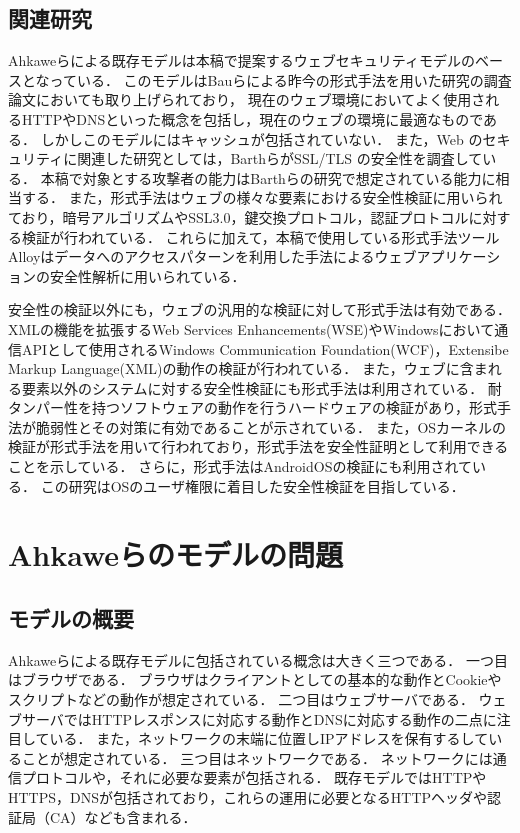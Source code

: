 \documentclass{css}
\begin{document}
\subsection{関連研究}
Ahkaweらによる既存モデル\cite{webmodel}は本稿で提案するウェブセキュリティモデルのベースとなっている．
このモデルはBauらによる昨今の形式手法を用いた研究の調査論文\cite{security_modeling_and_analysis}においても取り上げられており，
現在のウェブ環境においてよく使用されるHTTPやDNSといった概念を包括し，現在のウェブの環境に最適なものである．
しかしこのモデルにはキャッシュが包括されていない．
また，Web のセキュリティに関連した研究としては，Barthら\cite{securing_frame_communication_in_browsers}がSSL/TLS の安全性を調査している．
本稿で対象とする攻撃者の能力はBarthらの研究で想定されている能力に相当する．
また，形式手法はウェブの様々な要素における安全性検証に用いられており，暗号アルゴリズムやSSL3.0，鍵交換プロトコル，認証プロトコルに対する検証が行われている\cite{TFFWS17,TFFWS18,TFFWS19,TFFWS20}．
これらに加えて，本稿で使用している形式手法ツールAlloyはデータへのアクセスパターンを利用した手法によるウェブアプリケーションの安全性解析に用いられている\cite{finding_security_bugs_in_web}．

安全性の検証以外にも，ウェブの汎用的な検証に対して形式手法は有効である．
XMLの機能を拡張するWeb Services Enhancements(WSE)やWindowsにおいて通信APIとして使用されるWindows Communication Foundation(WCF)，Extensibe Markup Language(XML)の動作の検証\cite{TFFWS27,TFFWS28}が行われている．
また，ウェブに含まれる要素以外のシステムに対する安全性検証にも形式手法は利用されている．
耐タンパー性を持つソフトウェアの動作を行うハードウェアの検証\cite{specifying_and_verifying_hardware_for}があり，形式手法が脆弱性とその対策に有効であることが示されている．
また，OSカーネルの検証\cite{sel4_formal_verification_of_an}が形式手法を用いて行われており，形式手法を安全性証明として利用できることを示している．
さらに，形式手法はAndroidOSの検証\cite{towards_formal_analysis_of_the}にも利用されている．
この研究はOSのユーザ権限に着目した安全性検証を目指している．

\section{Ahkaweらのモデルの問題}

\subsection{モデルの概要}
\label{sec:existingmodel}
Ahkaweらによる既存モデル\cite{webmodel}に包括されている概念は大きく三つである．
一つ目はブラウザである．
ブラウザはクライアントとしての基本的な動作とCookieやスクリプトなどの動作が想定されている．
二つ目はウェブサーバである．
ウェブサーバではHTTPレスポンスに対応する動作とDNSに対応する動作の二点に注目している．
また，ネットワークの末端に位置しIPアドレスを保有するしていることが想定されている．
三つ目はネットワークである．
ネットワークには通信プロトコルや，それに必要な要素が包括される．
既存モデルではHTTPやHTTPS，DNSが包括されており，これらの運用に必要となるHTTPヘッダや認証局（CA）なども含まれる．
\end{document}
